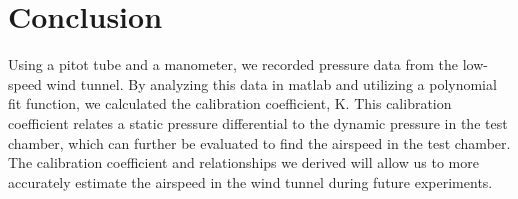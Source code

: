 \chapter{Conclusion}
\label{cp:conclusion}

Using a pitot tube and a manometer, we recorded pressure data from the low-speed wind tunnel. By analyzing this data in \acrshort{matlab} and utilizing a polynomial fit function, we calculated the calibration coefficient, \gls{K}. This calibration coefficient relates a static pressure differential to the dynamic pressure in the test chamber, which can further be evaluated to find the airspeed in the test chamber. The calibration coefficient and relationships we derived will allow us to more accurately estimate the airspeed in the wind tunnel during future experiments.
